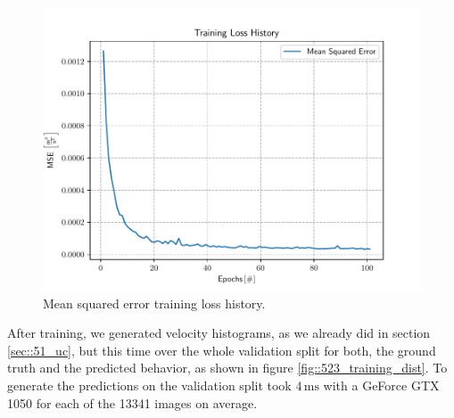 \begin{figure}[h]
	\centering
	\includegraphics[scale=.4]{chapters/05_experiments/02_autonomous_walking/05_07_19_loss_history.pdf}
	\caption{Mean squared error training loss history.}
	\label{fig::523_loss}
\end{figure}
After training, we generated velocity histograms, as we already did in section \ref{sec::51_uc}, but this time over the whole validation split for both, the ground truth and the predicted behavior, as shown in figure \ref{fig::523_training_dist}. To generate the predictions on the validation split took $4\,\text{ms}$ with a GeForce GTX 1050 for each of the 13341 images on average.

